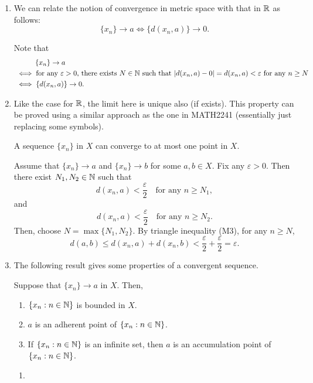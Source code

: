 \begin{enumerate}
\item \label{it:ms-conv-relate-real-conv} We can relate the notion of
convergence in metric space with that in \(\mathbb{R}\) as follows:
\[\{x_n\}\to a\iff \{d(x_n,a)\}\to 0.\]
\begin{pf}
Note that
\begin{align*}
&\hspace{1cm}\{x_n\}\to a\\
&\iff \text{for any \(\varepsilon>0\), there exists \(N\in\mathbb{N}\) such that \(|d(x_n,a)-0|=d(x_n,a)<\varepsilon\) for any \(n\ge N\)}\\
&\iff \{d(x_n,a)\}\to 0.
\end{align*}
\end{pf}
\item Like the case for \(\mathbb{R}\), the limit here is unique also (if exists). This
property can be proved using a similar approach as the one in MATH2241
(essentially just replacing some symbols).
\begin{proposition}
\label{prp:limit-uniqueness}
A sequence \(\{x_n\}\) in \(X\) can converge to at most one point in \(X\).
\end{proposition}
\begin{pf}
Assume that \(\{x_n\}\to a\) and \(\{x_n\}\to b\) for some \(a,b\in X\).  Fix
any \(\varepsilon>0\). Then there exist \(N_1,N_2\in \mathbb{N}\) such that
\[
d(x_n,a)<\frac{\varepsilon}{2}\quad\text{for any \(n\ge N_1\)},
\]
and
\[
d(x_n,a)<\frac{\varepsilon}{2}\quad\text{for any \(n\ge N_2\)}.
\]
Then, choose \(N=\max\{N_1,N_2\}\). By triangle inequality (M3), for any \(n\ge
N\),
\[
d(a,b)\le d(x_n,a)+d(x_n,b)<\frac{\varepsilon}{2}+\frac{\varepsilon}{2}=\varepsilon.
\]
\end{pf}
\item The following result gives some properties of a convergent sequence.
\begin{proposition}
\label{prp:conv-seq-prop}
Suppose that \(\{x_n\}\to a\) in \(X\). Then,
\begin{enumerate}
\item \(\{x_n:n\in\mathbb{N}\}\) is bounded in \(X\).
\item \(a\) is an adherent point of \(\{x_n:n\in\mathbb{N}\}\).
\item If \(\{x_n:n\in\mathbb{N}\}\) is an infinite set, then \(a\) is an accumulation
point of \(\{x_n:n\in\mathbb{N}\}\).
\end{enumerate}
\end{proposition}
\begin{pf}
\begin{enumerate}
\item 
\end{enumerate}
\end{pf}
\end{enumerate}
